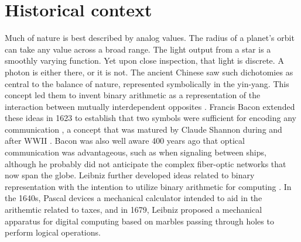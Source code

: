 \documentclass[twocolumn]{article}
\begin{document}
\section{\label{sec:history}Historical context}
Much of nature is best described by analog values. The radius of a planet's orbit can take any value across a broad range. The light output from a star is a smoothly varying function. Yet upon close inspection, that light is discrete. A photon is either there, or it is not. The ancient Chinese saw such dichotomies as central to the balance of nature, represented symbolically in the yin-yang. This concept led them to invent binary arithmetic as a representation of the interaction between mutually interdependent opposites \cite{http://www.atimes.com/leibniz-chinese-invented-first-binary-code/}. Francis Bacon extended these ideas in 1623 to establish that two symbols were sufficient for encoding any communication \cite{dy2012}, a concept that was matured by Claude Shannon during and after WWII \cite{sh1948}. Bacon was also well aware 400 years ago that optical communication was advantageous, such as when signaling between ships, although he probably did not anticipate the complex fiber-optic networks that now span the globe. Leibniz further developed ideas related to binary representation \cite{http://www.leibniz-translations.com/binary.htm} with the intention to utilize binary arithmetic for computing \cite{https://hal.archives-ouvertes.fr/ads-00104781/document,dy2012}. In the 1640s, Pascal devices a mechanical calculator intended to aid in the arithemtic related to taxes, and in 1679, Leibniz proposed a mechanical apparatus for digital computing based on marbles passing through holes to perform logical operations.
\end{document}
